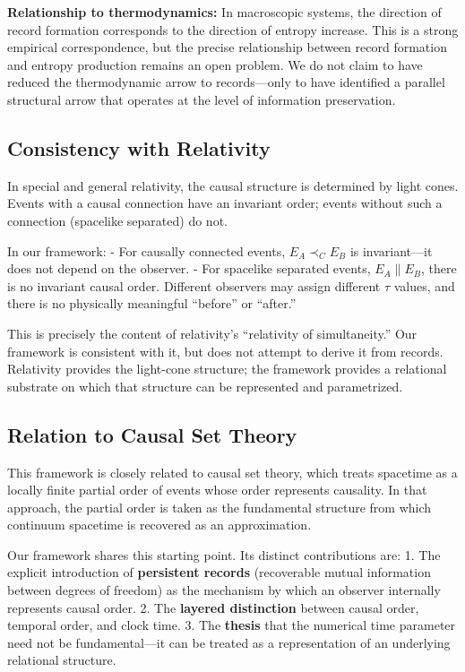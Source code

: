 \documentclass[12pt, a4paper]{article}
\begin{document}
\textbf{Relationship to thermodynamics:} In macroscopic systems, the direction of record formation corresponds to the direction of entropy increase. This is a strong empirical correspondence, but the precise relationship between record formation and entropy production remains an open problem. We do not claim to have reduced the thermodynamic arrow to records---only to have identified a parallel structural arrow that operates at the level of information preservation.

\subsection{Consistency with Relativity}

In special and general relativity, the causal structure is determined by light cones. Events with a causal connection have an invariant order; events without such a connection (spacelike separated) do not.

In our framework:
- For causally connected events, \( E_A \prec_C E_B \) is invariant---it does not depend on the observer.
- For spacelike separated events, \( E_A \parallel E_B \), there is no invariant causal order. Different observers may assign different \( \tau \) values, and there is no physically meaningful ``before'' or ``after.''

This is precisely the content of relativity's ``relativity of simultaneity.'' Our framework is consistent with it, but does not attempt to derive it from records. Relativity provides the light-cone structure; the framework provides a relational substrate on which that structure can be represented and parametrized.

\subsection{Relation to Causal Set Theory}

This framework is closely related to causal set theory, which treats spacetime as a locally finite partial order of events whose order represents causality. In that approach, the partial order is taken as the fundamental structure from which continuum spacetime is recovered as an approximation.

Our framework shares this starting point. Its distinct contributions are:
1. The explicit introduction of \textbf{persistent records} (recoverable mutual information between degrees of freedom) as the mechanism by which an observer internally represents causal order.
2. The \textbf{layered distinction} between causal order, temporal order, and clock time.
3. The \textbf{thesis} that the numerical time parameter need not be fundamental---it can be treated as a representation of an underlying relational structure.
\end{document}
